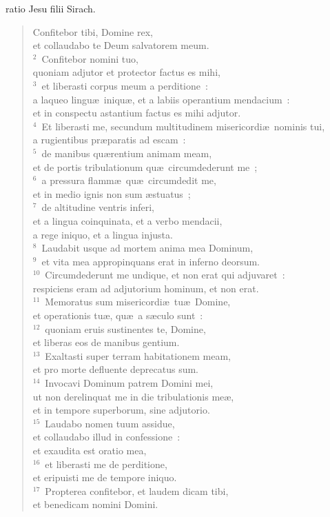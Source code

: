 \bchapter
{}ratio Jesu filii Sirach. \begin{verse}Confitebor tibi, Domine rex,\\ et collaudabo te Deum salvatorem meum.\\
${}^{2}$~Confitebor nomini tuo,\\ quoniam adjutor et protector factus es mihi,\\
${}^{3}$~et liberasti corpus meum a perditione~:\\ a laqueo lingu\ae\ iniqu\ae , et a labiis operantium mendacium~:\\ et in conspectu astantium factus es mihi adjutor.\\
${}^{4}$~Et liberasti me, secundum multitudinem misericordi\ae\ nominis tui,\\ a rugientibus pr\ae paratis ad escam~:\\
${}^{5}$~de manibus qu\ae rentium animam meam,\\ et de portis tribulationum qu\ae\ circumdederunt me~;\\
${}^{6}$~a pressura flamm\ae\ qu\ae\ circumdedit me,\\ et in medio ignis non sum \ae stuatus~;\\
${}^{7}$~de altitudine ventris inferi,\\ et a lingua coinquinata, et a verbo mendacii,\\ a rege iniquo, et a lingua injusta.\\
${}^{8}$~Laudabit usque ad mortem anima mea Dominum,\\
${}^{9}$~et vita mea appropinquans erat in inferno deorsum.\\
${}^{10}$~Circumdederunt me undique, et non erat qui adjuvaret~:\\ respiciens eram ad adjutorium hominum, et non erat.\\
${}^{11}$~Memoratus sum misericordi\ae\ tu\ae\ Domine,\\ et operationis tu\ae , qu\ae\ a s\ae culo sunt~:\\
${}^{12}$~quoniam eruis sustinentes te, Domine,\\ et liberas eos de manibus gentium.\\
${}^{13}$~Exaltasti super terram habitationem meam,\\ et pro morte defluente deprecatus sum.\\
${}^{14}$~Invocavi Dominum patrem Domini mei,\\ ut non derelinquat me in die tribulationis me\ae ,\\ et in tempore superborum, sine adjutorio.\\
${}^{15}$~Laudabo nomen tuum assidue,\\ et collaudabo illud in confessione~:\\ et exaudita est oratio mea,\\
${}^{16}$~et liberasti me de perditione,\\ et eripuisti me de tempore iniquo.\\
${}^{17}$~Propterea confitebor, et laudem dicam tibi,\\ et benedicam nomini Domini.\end{verse}


